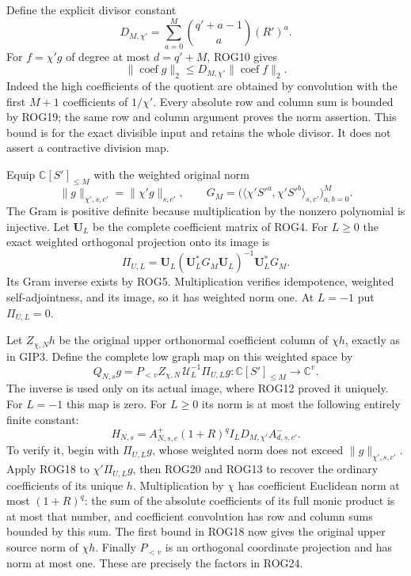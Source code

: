 \documentclass[11pt,a4paper]{article}
\begin{document}
Define the explicit divisor constant
\[
 D_{M,\chi'}=\sum_{a=0}^{M}\binom{q'+a-1}{a}(R')^a.
 \tag{ROG19}
\]
For $f=\chi'g$ of degree at most $d=q'+M$, ROG10 gives
\[
 \|\operatorname{coef}g\|_2
       \le D_{M,\chi'}\|\operatorname{coef}f\|_2.
 \tag{ROG20}
\]
Indeed the high coefficients of the quotient are obtained by
convolution with the first $M+1$ coefficients of $1/\chi'$.
Every absolute row and column sum is bounded by ROG19;
the same row and column argument proves the norm assertion.
This bound is for the exact divisible input and retains the
whole divisor. It does not assert a contractive division map.

Equip $\mathbb C[S']_{\le M}$ with the weighted original norm
\[
 \|g\|_{\chi',s,c'}=\|\chi'g\|_{s,c'},\qquad
 G_M=\big(\langle\chi'S'^a,\chi'S'^b\rangle_{s,c'}\big)_{a,b=0}^M.
 \tag{ROG21}
\]
The Gram is positive definite because multiplication by the
nonzero polynomial is injective. Let $\mathbf U_L$ be the
complete coefficient matrix of ROG4. For $L\ge0$ the exact
weighted orthogonal projection onto its image is
\[
 \Pi_{U,L}=\mathbf U_L(\mathbf U_L^*G_M\mathbf U_L)^{-1}
                         \mathbf U_L^*G_M.
 \tag{ROG22}
\]
Its Gram inverse exists by ROG5. Multiplication verifies
idempotence, weighted self-adjointness, and its image, so it
has weighted norm one. At $L=-1$ put $\Pi_{U,L}=0$.

Let $Z_{\chi,N}h$ be the original upper orthonormal
coefficient column of $\chi h$, exactly as in GIP3. Define
the complete low graph map on this weighted space by
\[
 Q_{N,s}g=P_{<v}Z_{\chi,N}\,\mathcal U_L^{-1}\Pi_{U,L}g
      :\mathbb C[S']_{\le M}\longrightarrow\mathbb C^v.
 \tag{ROG23}
\]
The inverse is used only on its actual image, where ROG12
proved it uniquely. For $L=-1$ this map is zero. For $L\ge0$
its norm is at most the following entirely finite constant:
\[
 H_{N,s}=A^+_{N,s,c}(1+R)^q I_L D_{M,\chi'} A^-_{d,s,c'}.
 \tag{ROG24}
\]
To verify it, begin with $\Pi_{U,L}g$, whose weighted norm
does not exceed $\|g\|_{\chi',s,c'}$. Apply ROG18 to
$\chi'\Pi_{U,L}g$, then ROG20 and ROG13 to recover the
ordinary coefficients of its unique $h$. Multiplication by
$\chi$ has coefficient Euclidean norm at most $(1+R)^q$:
the sum of the absolute coefficients of its full monic product
is at most that number, and coefficient convolution has row
and column sums bounded by this sum. The first bound in ROG18
now gives the original upper source norm of $\chi h$.
Finally $P_{<v}$ is an orthogonal coordinate projection and
has norm at most one. These are precisely the factors in ROG24.
\end{document}
